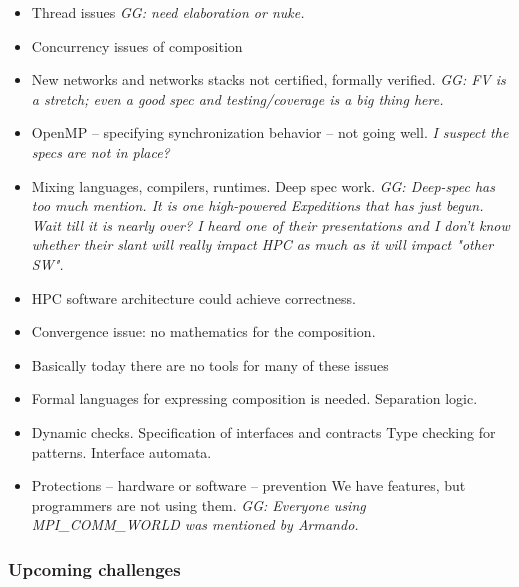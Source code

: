 \begin{tiny}
\begin{itemize}
\begin{itemize}
\item  Thread issues {\small\em GG: need elaboration or nuke.}

\item  Concurrency issues of composition

\item  New networks and networks stacks not certified, formally verified. {\small\em GG: FV is a stretch; even a good spec and testing/coverage is a big thing here.}

\item  OpenMP – specifying synchronization behavior – not going well. {\small\em I suspect the specs are not in place?}

\item  Mixing languages, compilers, runtimes. Deep spec work. {\small\em GG: Deep-spec has too much mention. It
 is one high-powered Expeditions that has just begun. Wait
  till it is nearly over? I heard one of their presentations and I don't know whether their slant will really impact HPC as much as it will impact "other SW".}

\item HPC software architecture could achieve correctness. 

\item  Convergence issue: no mathematics for the composition. 

\item  Basically today there are no tools for many of these issues

\item  Formal languages for expressing composition is needed. Separation logic. 

\item  Dynamic checks. 
Specification of interfaces and contracts 
Type checking for patterns.
Interface automata.

\item  Protections – hardware or software – prevention
We have features, but programmers are not using them. {\small\em GG: Everyone using MPI\_COMM\_WORLD was mentioned by Armando.}

\end{itemize}
 
\end{itemize}
   
\end{tiny}
   
     

    
 \subsubsection{Upcoming challenges}
 \label{sec:challenges-upcoming}
 



